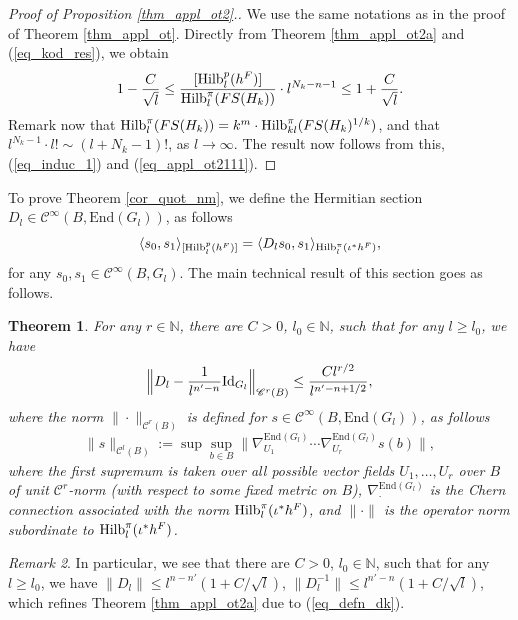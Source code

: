\documentclass[12pt]{article}
\numberwithin{equation}{section}
\theoremstyle{theorem}
\newtheorem{thm}{Theorem}[section]
\theoremstyle{definition}
\theoremstyle{remark}
\newtheorem{rem}[thm]{Remark}
\newcommand{\nat}{\mathbb{N}}
\newcommand{\enmr}[1]{\text{End}{(#1)}}
\newcommand{\ccal}{\mathscr{C}}
\newcommand{\scal}[2]{\langle #1, #2 \rangle}
\begin{document}
	\begin{proof}[Proof of Proposition \ref{thm_appl_ot2}.]
		We use the same notations as in the proof of Theorem \ref{thm_appl_ot}.
		Directly from Theorem \ref{thm_appl_ot2a} and (\ref{eq_kod_res}), we obtain
		\begin{equation}\label{eq_appl_ot2111}
			1 - \frac{C}{\sqrt{l}}
			\leq
			\frac{[{\rm{Hilb}}_l^p(h^F)]}{{\rm{Hilb}}_{l}^{\pi}(FS(H_k))} \cdot l^{N_k - n - 1}
			\leq
			1 + \frac{C}{\sqrt{l}}.
		\end{equation}
		Remark now that ${\rm{Hilb}}_{l}^{\pi}(FS(H_k)) = k^m \cdot {\rm{Hilb}}_{kl}^{\pi}(FS(H_k)^{1/k})$, and that $l^{N_k - 1} \cdot l! \sim (l + N_k - 1)!$, as $l \to \infty$.
		The result now follows from this, (\ref{eq_induc_1}) and (\ref{eq_appl_ot2111}).
	\end{proof}
	\par 
	To prove Theorem \ref{cor_quot_nm}, we define the Hermitian section $D_l \in \ccal^{\infty}(B, \enmr{G_l})$, as follows
	\begin{equation}\label{eq_defn_dk}
		\scal{s_0}{s_1}_{[{\rm{Hilb}}_l^p(h^F)]}
		=
		\scal{D_l s_0}{s_1}_{{\rm{Hilb}}_l^{\pi}(\iota^* h^F)},
	\end{equation}
	for any $s_0, s_1 \in \ccal^{\infty}(B, G_l)$.
	The main technical result of this section goes as follows.
	\begin{thm}\label{thm_dk_as}
		For any $r \in \nat$, there are $C > 0$, $l_0 \in \nat$, such that for any $l \geq l_0$, we have
		\begin{equation}\label{eq_dk_as}
			\Big\| 
				D_l
				-
				\frac{1}{l^{n' - n}} {\rm{Id}}_{G_l}
			\Big\|_{\ccal^r(B)}
			\leq 
			\frac{C l^{r / 2}}{l^{n' - n + 1/2}},
		\end{equation}
		where the norm $\| \cdot \|_{\ccal^r(B)}$ is defined for $s \in \ccal^{\infty}(B, \enmr{G_l})$, as follows 
		\begin{equation}
			\| s \|_{\ccal^{l}(B)}
			:=
			\sup \sup_{b \in B} \| \nabla^{\enmr{G_l}}_{U_1} \cdots \nabla^{\enmr{G_l}}_{U_r}  s(b) \|,
		\end{equation}
		where the first supremum is taken over all possible vector fields $U_1, \ldots, U_r$ over $B$ of unit $\mathscr{C}^r$-norm (with respect to some fixed metric on $B$),  $\nabla^{\enmr{G_l}}_{\cdot}$ is the Chern connection associated with the norm ${\rm{Hilb}}_l^{\pi}(\iota^* h^F)$, and $\| \cdot \|$ is the operator norm subordinate to ${\rm{Hilb}}_l^{\pi}(\iota^* h^F)$.
	\end{thm}
	\begin{rem}
		In particular, we see that there are $C > 0$, $l_0 \in \nat$, such that for any $l \geq l_0$, we have $\| D_l \| \leq l^{n - n'}(1 + C / \sqrt{l})$, $\| D_l^{-1} \| \leq l^{n' - n}(1 + C / \sqrt{l})$, which refines Theorem \ref{thm_appl_ot2a} due to (\ref{eq_defn_dk}).
	\end{rem}
\end{document}
